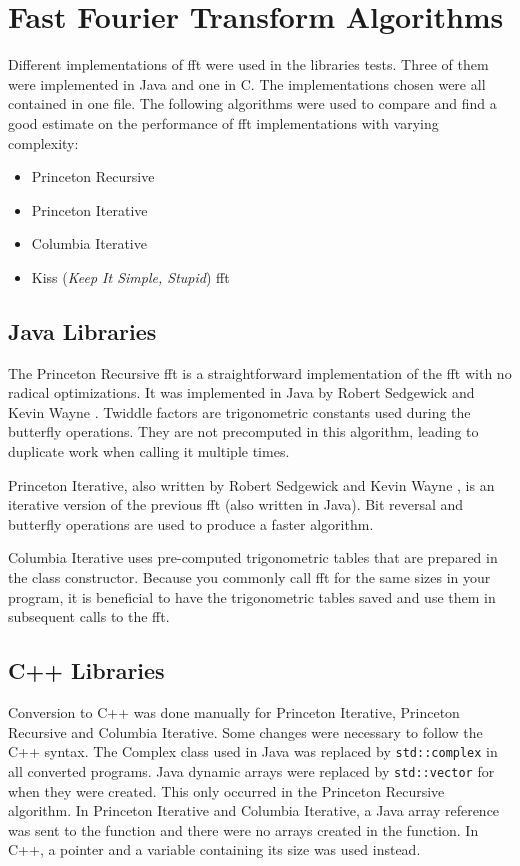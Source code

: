 \section{Fast Fourier Transform Algorithms}

Different implementations of \gls{fft} were used in the libraries tests. Three of them were implemented in Java and one in C. The implementations chosen were all contained in one file. The following algorithms were used to compare and find a good estimate on the performance of \gls{fft} implementations with varying complexity:

\begin{itemize}
    \item Princeton Recursive \cite{princeton:recursive}
    \item Princeton Iterative \cite{princeton:iterative}
    \item Columbia Iterative \cite{columbia:iterative}
    \item Kiss (\emph{Keep It Simple, Stupid}) \gls{fft} \cite{kiss:fft}
\end{itemize}

\subsection{Java Libraries}

The Princeton Recursive \gls{fft} is a straightforward implementation of the \gls{fft} with no radical optimizations. It was implemented in Java by Robert Sedgewick and Kevin Wayne \cite{princeton:recursive}. Twiddle factors are trigonometric constants used during the butterfly operations. They are not precomputed in this algorithm, leading to duplicate work when calling it multiple times.

Princeton Iterative, also written by Robert Sedgewick and Kevin Wayne \cite{princeton:iterative}, is an iterative version of the previous \gls{fft} (also written in Java). Bit reversal and butterfly operations are used to produce a faster algorithm.

Columbia Iterative \cite{columbia:iterative} uses pre-computed trigonometric tables that are prepared in the class constructor. Because you commonly call \gls{fft} for the same sizes in your program, it is beneficial to have the trigonometric tables saved and use them in subsequent calls to the \gls{fft}.

\subsection{C++ Libraries}
Conversion to C++ was done manually for Princeton Iterative, Princeton Recursive and Columbia Iterative. Some changes were necessary to follow the C++ syntax. The Complex class used in Java was replaced by \texttt{std::complex} in all converted programs. Java dynamic arrays were replaced by \texttt{std::vector} for when they were created. This only occurred in the Princeton Recursive algorithm. In Princeton Iterative and Columbia Iterative, a Java array reference was sent to the function and there were no arrays created in the function. In C++, a pointer and a variable containing its size was used instead.

